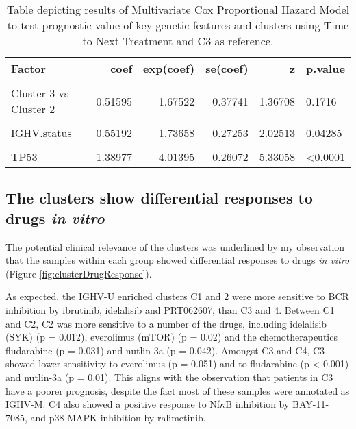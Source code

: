\documentclass[11pt, a4paper, twosided]{book}
\begin{document}
\begin{table}

\caption{\label{tab:clusterCox}Table depicting results of Multivariate Cox Proportional Hazard Model to test prognostic value of key genetic features and clusters using Time to Next Treatment and C3 as reference. }
\centering
\begin{tabular}[t]{l|r|r|r|r|l}
\hline
Factor & coef & exp(coef) & se(coef) & z & p.value\\
\hline
\cellcolor[HTML]{E2E868}{Cluster 3 vs Cluster 1} & \cellcolor[HTML]{E2E868}{-0.03979} & \cellcolor[HTML]{E2E868}{0.96099} & \cellcolor[HTML]{E2E868}{0.29813} & \cellcolor[HTML]{E2E868}{-0.13347} & \cellcolor[HTML]{E2E868}{0.89382}\\
\hline
Cluster 3 vs Cluster 2 & 0.51595 & 1.67522 & 0.37741 & 1.36708 & 0.1716\\
\hline
\cellcolor[HTML]{E2E868}{Cluster 3 vs Cluster 4} & \cellcolor[HTML]{E2E868}{-0.82011} & \cellcolor[HTML]{E2E868}{0.44038} & \cellcolor[HTML]{E2E868}{0.39760} & \cellcolor[HTML]{E2E868}{-2.06267} & \cellcolor[HTML]{E2E868}{0.03914}\\
\hline
IGHV.status & 0.55192 & 1.73658 & 0.27253 & 2.02513 & 0.04285\\
\hline
\cellcolor[HTML]{E2E868}{trisomy 12} & \cellcolor[HTML]{E2E868}{-0.13357} & \cellcolor[HTML]{E2E868}{0.87496} & \cellcolor[HTML]{E2E868}{0.35617} & \cellcolor[HTML]{E2E868}{-0.37503} & \cellcolor[HTML]{E2E868}{0.70764}\\
\hline
TP53 & 1.38977 & 4.01395 & 0.26072 & 5.33058 & <0.0001\\
\hline
\end{tabular}
\end{table}
\hypertarget{the-clusters-show-differential-responses-to-drugs-in-vitro}{%
\subsection{\texorpdfstring{The clusters show differential responses to drugs \emph{in vitro}}{The clusters show differential responses to drugs in vitro}}\label{the-clusters-show-differential-responses-to-drugs-in-vitro}}

The potential clinical relevance of the clusters was underlined by my observation that the samples within each group showed differential responses to drugs \emph{in vitro} (Figure \ref{fig:clusterDrugResponse}).

As expected, the IGHV-U enriched clusters C1 and 2 were more sensitive to BCR inhibition by ibrutinib, idelalisib and PRT062607, than C3 and 4. Between C1 and C2, C2 was more sensitive to a number of the drugs, including idelalisib (SYK) (p = 0.012), everolimus (mTOR) (p = 0.02) and the chemotherapeutics fludarabine (p = 0.031) and nutlin-3a (p = 0.042). Amongst C3 and C4, C3 showed lower sensitivity to everolimus (p = 0.051) and to fludarabine (p \textless{} 0.001) and nutlin-3a (p = 0.01). This aligns with the observation that patients in C3 have a poorer prognosis, despite the fact most of these samples were annotated as IGHV-M. C4 also showed a positive response to Nf\(\kappa\)B inhibition by BAY-11-7085, and p38 MAPK inhibition by ralimetinib.
\end{document}
